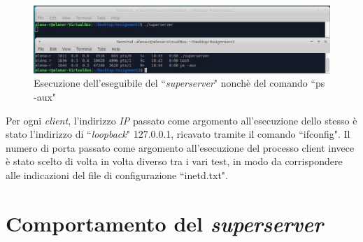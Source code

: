 \documentclass[a4paper, 12pt]{report}
\begin{document}
\begin{figure}[H]
	\centering
	\includegraphics[width=\linewidth]{images/launch_superserver.JPG}
	\caption{Esecuzione dell'eseguibile del ``\textit{superserver}" nonchè del comando ``ps -aux"}
\end{figure}

Per ogni \textit{client}, l'indirizzo \textit{IP} passato come argomento all'esecuzione dello stesso è 
stato l'indirizzo di ``\textit{loopback}" 127.0.0.1, ricavato tramite il comando ``ifconfig". Il numero di porta passato come argomento all'esecuzione del processo client
invece è stato scelto di volta in volta diverso tra i vari test, in modo da corrispondere alle indicazioni del file di configurazione ``inetd.txt".

\section{Comportamento del \textit{superserver}}
\end{document}
